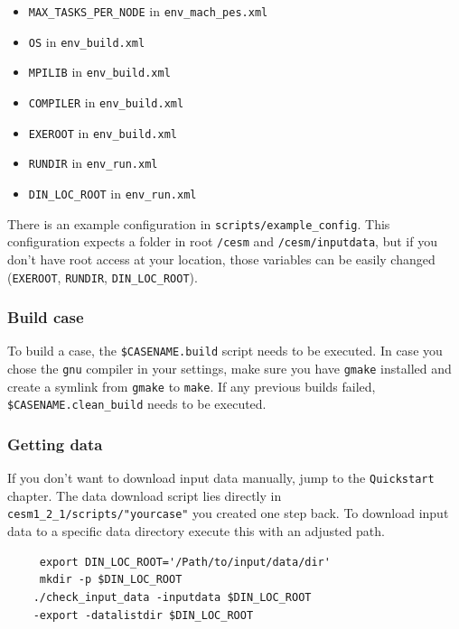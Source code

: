 \documentclass[]{article}
\providecommand{\tightlist}{%
  \setlength{\itemsep}{0pt}\setlength{\parskip}{0pt}}
\begin{document}
\begin{itemize}
\tightlist
\item
  \texttt{MAX\_TASKS\_PER\_NODE} in \texttt{env\_mach\_pes.xml}
\item
  \texttt{OS} in \texttt{env\_build.xml}
\item
  \texttt{MPILIB} in \texttt{env\_build.xml}
\item
  \texttt{COMPILER} in \texttt{env\_build.xml}
\item
  \texttt{EXEROOT} in \texttt{env\_build.xml}
\item
  \texttt{RUNDIR} in \texttt{env\_run.xml}
\item
  \texttt{DIN\_LOC\_ROOT} in \texttt{env\_run.xml}
\end{itemize}

There is an example configuration in \texttt{scripts/example\_config}.
This configuration expects a folder in root \texttt{/cesm} and
\texttt{/cesm/inputdata}, but if you don't have root access at your
location, those variables can be easily changed (\texttt{EXEROOT},
\texttt{RUNDIR}, \texttt{DIN\_LOC\_ROOT}).

\subsubsection{Build case}\label{build-case}

To build a case, the \texttt{\$CASENAME.build} script needs to be
executed. In case you chose the \texttt{gnu} compiler in your settings,
make sure you have \texttt{gmake} installed and create a symlink from
\texttt{gmake} to \texttt{make}. If any previous builds failed,
\texttt{\$CASENAME.clean\_build} needs to be executed.

\subsubsection{Getting data}\label{getting-data}

If you don't want to download input data manually, jump to the
\texttt{Quickstart} chapter. The data download script lies directly in
\texttt{cesm1\_2\_1/scripts/"yourcase"} you created one step back. To
download input data to a specific data directory execute this with an
adjusted path.

\begin{verbatim}
     export DIN_LOC_ROOT='/Path/to/input/data/dir'
     mkdir -p $DIN_LOC_ROOT
    ./check_input_data -inputdata $DIN_LOC_ROOT 
    -export -datalistdir $DIN_LOC_ROOT  
\end{verbatim}
\end{document}
